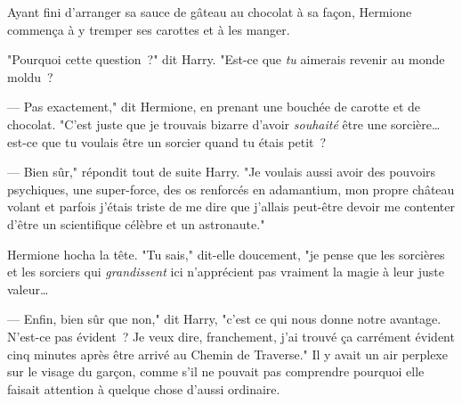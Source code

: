 Ayant fini d'arranger sa sauce de gâteau au chocolat à sa façon, Hermione commença à y tremper ses carottes et à les manger.

"Pourquoi cette question~?" dit Harry. "Est-ce que \emph{tu} aimerais revenir au monde moldu~?

--- Pas exactement," dit Hermione, en prenant une bouchée de carotte et de chocolat. "C'est juste que je trouvais bizarre d'avoir \emph{souhaité} être une sorcière… est-ce que tu voulais être un sorcier quand tu étais petit~?

--- Bien sûr," répondit tout de suite Harry. "Je voulais aussi avoir des pouvoirs psychiques, une super-force, des os renforcés en adamantium, mon propre château volant et parfois j'étais triste de me dire que j'allais peut-être devoir me contenter d'être un scientifique célèbre et un astronaute."

Hermione hocha la tête. "Tu sais," dit-elle doucement, "je pense que les sorcières et les sorciers qui \emph{grandissent} ici n'apprécient pas vraiment la magie à leur juste valeur…

--- Enfin, bien sûr que non," dit Harry, "c'est ce qui nous donne notre avantage. N'est-ce pas évident~? Je veux dire, franchement, j'ai trouvé ça carrément évident cinq minutes après être arrivé au Chemin de Traverse." Il y avait un air perplexe sur le visage du garçon, comme s'il ne pouvait pas comprendre pourquoi elle faisait attention à quelque chose d'aussi ordinaire. 

